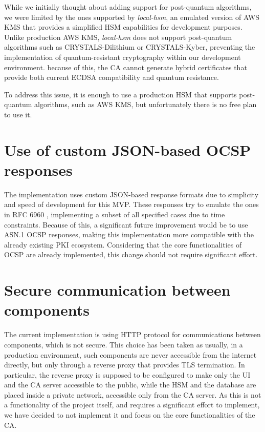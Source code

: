 While we initially thought about adding support for post-quantum algorithms, we were limited by the ones 
supported by \textit{local-hsm}, an emulated version of AWS KMS that provides a 
simplified HSM capabilities for development purposes. Unlike production AWS KMS, \textit{local-hsm} does 
not support post-quantum algorithms such as CRYSTALS-Dilithium or CRYSTALS-Kyber, preventing the 
implementation of quantum-resistant cryptography within our development environment. because of this,
the CA cannot generate hybrid certificates that provide both current ECDSA compatibility 
and quantum resistance.

To address this issue, it is enough to use a production HSM that supports post-quantum algorithms, such as AWS KMS,
but unfortunately there is no free plan to use it.

\section{Use of custom JSON-based OCSP responses}

The implementation uses custom JSON-based response formats due to simplicity and speed of development 
for this MVP. These responses try to emulate the ones in RFC 6960 \cite{rfc6960}, implementing a subset of all
specified cases due to time constraints.
Because of this, a significant future improvement would be to use ASN.1 OCSP responses, making this 
implementation more compatible with the already existing PKI ecosystem. Considering that the core 
functionalities of OCSP are already implemented, this change should not require significant effort.

\section{Secure communication between components}
The current implementation is using HTTP protocol for communications between components, which is not 
secure. This choice has been taken as usually, in a production environment, such components are 
never accessible from the internet directly, but only through a reverse proxy that
provides TLS termination. In particular, the reverse proxy is supposed to be configured to make
only the UI and the CA server accessible to the public, while the HSM and the database are 
placed inside a private network, accessible only from the CA server. As this is not a functionality
of the project itself, and requires a significant effort to implement, we have decided to not implement 
it and focus on the core functionalities of the CA.